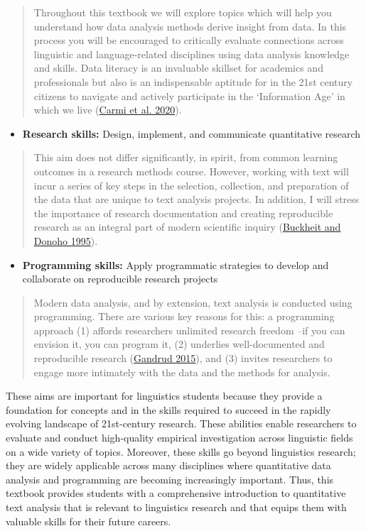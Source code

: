 \documentclass[
  letterpaper,
  DIV=11,
  numbers=noendperiod]{scrreport}
\providecommand{\tightlist}{%
  \setlength{\itemsep}{0pt}\setlength{\parskip}{0pt}}\usepackage{longtable,booktabs,array}
\theoremstyle{definition}
\theoremstyle{remark}
\begin{document}
\begin{quote}
Throughout this textbook we will explore topics which will help you
understand how data analysis methods derive insight from data. In this
process you will be encouraged to critically evaluate connections across
linguistic and language-related disciplines using data analysis
knowledge and skills. Data literacy is an invaluable skillset for
academics and professionals but also is an indispensable aptitude for in
the 21st century citizens to navigate and actively participate in the
`Information Age' in which we live
(\protect\hyperlink{ref-Carmi2020}{Carmi et al. 2020}).
\end{quote}

\begin{itemize}
\tightlist
\item
  \textbf{Research skills:} Design, implement, and communicate
  quantitative research
\end{itemize}

\begin{quote}
This aim does not differ significantly, in spirit, from common learning
outcomes in a research methods course. However, working with text will
incur a series of key steps in the selection, collection, and
preparation of the data that are unique to text analysis projects. In
addition, I will stress the importance of research documentation and
creating reproducible research as an integral part of modern scientific
inquiry (\protect\hyperlink{ref-Buckheit1995}{Buckheit and Donoho
1995}).
\end{quote}

\begin{itemize}
\tightlist
\item
  \textbf{Programming skills:} Apply programmatic strategies to develop
  and collaborate on reproducible research projects
\end{itemize}

\begin{quote}
Modern data analysis, and by extension, text analysis is conducted using
programming. There are various key reasons for this: a programming
approach (1) affords researchers unlimited research freedom --if you can
envision it, you can program it, (2) underlies well-documented and
reproducible research (\protect\hyperlink{ref-Gandrud2015}{Gandrud
2015}), and (3) invites researchers to engage more intimately with the
data and the methods for analysis.
\end{quote}

These aims are important for linguistics students because they provide a
foundation for concepts and in the skills required to succeed in the
rapidly evolving landscape of 21st-century research. These abilities
enable researchers to evaluate and conduct high-quality empirical
investigation across linguistic fields on a wide variety of topics.
Moreover, these skills go beyond linguistics research; they are widely
applicable across many disciplines where quantitative data analysis and
programming are becoming increasingly important. Thus, this textbook
provides students with a comprehensive introduction to quantitative text
analysis that is relevant to linguistics research and that equips them
with valuable skills for their future careers.
\end{document}
